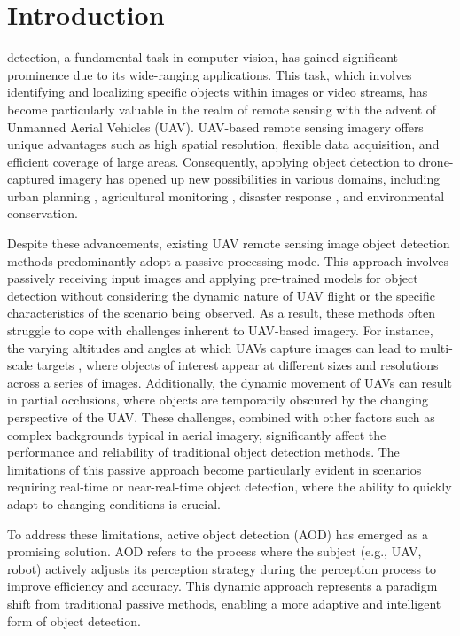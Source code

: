 \documentclass[lettersize,journal]{IEEEtran}
\begin{document}
\section{Introduction}
 detection, a fundamental task in computer vision, has gained significant prominence due to its wide-ranging applications. This task, which involves identifying and localizing specific objects within images or video streams, has become particularly valuable in the realm of remote sensing with the advent of Unmanned Aerial Vehicles (UAV). UAV-based remote sensing imagery offers unique advantages such as high spatial resolution, flexible data acquisition, and efficient coverage of large areas. Consequently, applying object detection to drone-captured imagery has opened up new possibilities in various domains, including urban planning \cite{remote2020}, agricultural monitoring \cite{estimating2014}, disaster response \cite{scheduling2021}, and environmental conservation\cite{reliability2019}.

Despite these advancements, existing UAV remote sensing image object detection methods predominantly adopt a passive processing mode. This approach involves passively receiving input images and applying pre-trained models for object detection without considering the dynamic nature of UAV flight or the specific characteristics of the scenario being observed. As a result, these methods often struggle to cope with challenges inherent to UAV-based imagery. For instance, the varying altitudes and angles at which UAVs capture images can lead to multi-scale targets \cite{empirical2021}, where objects of interest appear at different sizes and resolutions across a series of images. Additionally, the dynamic movement of UAVs can result in partial occlusions, where objects are temporarily obscured by the changing perspective of the UAV. These challenges, combined with other factors such as complex backgrounds typical in aerial imagery, significantly affect the performance and reliability of traditional object detection methods. The limitations of this passive approach become particularly evident in scenarios requiring real-time or near-real-time object detection, where the ability to quickly adapt to changing conditions is crucial.

To address these limitations, active object detection (AOD) \cite{hypothesis2013} has emerged as a promising solution. AOD refers to the process where the subject (e.g., UAV, robot) actively adjusts its perception strategy during the perception process to improve efficiency and accuracy. This dynamic approach represents a paradigm shift from traditional passive methods, enabling a more adaptive and intelligent form of object detection.
\end{document}
